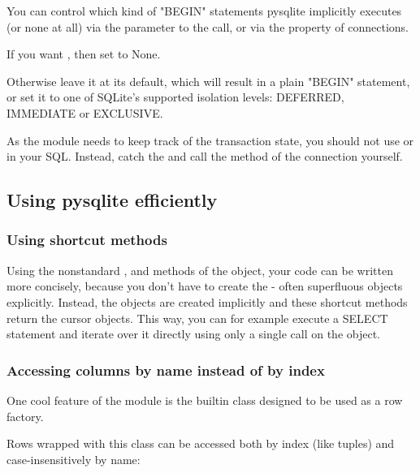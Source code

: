 You can control which kind of "BEGIN" statements pysqlite implicitly executes
(or none at all) via the  parameter to the
 call, or via the  property of
connections.

If you want , then set  to None.

Otherwise leave it at its default, which will result in a plain "BEGIN"
statement, or set it to one of SQLite's supported isolation levels: DEFERRED,
IMMEDIATE or EXCLUSIVE.

As the  module needs to keep track of the transaction state, you should
not use  or  in your SQL. Instead,
catch the  and call the  method of
the connection yourself.

\subsection{Using pysqlite efficiently}

\subsubsection{Using shortcut methods}

Using the nonstandard ,  and
 methods of the  object, your code can
be written more concisely, because you don't have to create the - often
superfluous  objects explicitly. Instead, the 
objects are created implicitly and these shortcut methods return the cursor
objects. This way, you can for example execute a SELECT statement and iterate
over it directly using only a single call on the  object.

    

\subsubsection{Accessing columns by name instead of by index}

One cool feature of the  module is the builtin  class
designed to be used as a row factory.

Rows wrapped with this class can be accessed both by index (like tuples) and
case-insensitively by name:

    


